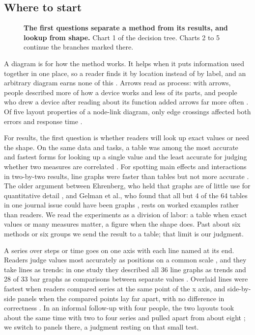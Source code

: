 \documentclass[11pt]{article}
\begin{document}
\subsection{Where to start}

\begin{figure}[tb]
  \centering
  \pvtreeStart
  \caption{\textbf{The first questions separate a method from its results,
    and lookup from shape.} Chart 1 of the decision tree. Charts 2 to 5
    continue the branches marked there.}
  \label{fig:tree-start}
\end{figure}

A diagram is for how the method works. It helps when it puts information
used together in one place, so a reader finds it by location instead of by
label, and an arbitrary diagram earns none of this
\citep[pp.~98--99]{larkin1987diagram}. Arrows read as process: with arrows,
people described more of how a device works and less of its parts, and
people who drew a device after reading about its function added arrows far
more often \citep[pp.~584--588]{heiser2006arrows}. Of five layout properties
of a node-link diagram, only edge crossings affected both errors and
response time \citep[Sec.~3.1]{purchase1997aesthetic}.

For results, the first question is whether readers will look up exact values
or need the shape. On the same data and tasks, a table was among the most
accurate and fastest forms for looking up a single value and the least
accurate for judging whether two measures are correlated
\citep[Table~1]{saket2019task}. For spotting main effects and interactions in
two-by-two results, line graphs were faster than tables but not more accurate
\citep[pp.~7, 11]{braithwaite2013flexibility}. The older argument between
Ehrenberg, who held that graphs are of little use for quantitative detail
\citep[pp.~281--286]{ehrenberg1977rudiments}, and Gelman et al., who found
that all but 4 of the 64 tables in one journal issue could have been graphs
\citep[Fig.~8]{gelman2002practice}, rests on worked examples rather than
readers. We read the experiments as a
division of labor: a table when exact values or many measures matter, a
figure when the shape does. Past about six methods or six groups we send the
result to a table; that limit is our judgment.

A series over steps or time goes on one axis with each line named at
its end. Readers judge values most accurately as positions on a common scale
\citep[p.~536]{cleveland1984graphical}, and they take lines as trends: in one
study they described all 36 line graphs as trends and 28 of 33 bar graphs as
comparisons between separate values \citep[Table~1]{zacks1999bars}. Overlaid
lines were fastest when readers compared series at the same point of the
x axis, and side-by-side panels when the compared points lay far apart, with
no difference in correctness \citep[Sec.~7, Fig.~11]{javed2010graphical}. In
an informal follow-up with four people, the two layouts took about the same
time with two to four series and pulled apart from about eight
\citep[Fig.~12]{javed2010graphical}; we switch to panels there, a judgment
resting on that small test.
\end{document}
